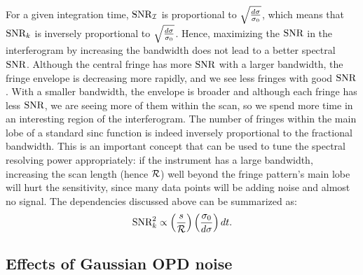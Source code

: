 For a given integration time, $\textrm{SNR}_{\mathcal{I}}$ is proportional to $\sqrt{\frac{d\sigma}{\sigma_0}}$, which means that $\textrm{SNR}_k$ is inversely proportional to $\sqrt{\frac{d\sigma}{\sigma_0}}$. Hence, maximizing the $\textrm{SNR}$ in the interferogram by increasing the bandwidth does not lead to a better spectral $\textrm{SNR}$. Although the central fringe has more $\textrm{SNR}$ with a larger bandwidth, the fringe envelope is decreasing more rapidly, and we see less fringes with good $\textrm{SNR}$. With a smaller bandwidth, the envelope is broader and although each fringe has less $\textrm{SNR}$, we are seeing more of them within the scan, so we spend more time in an interesting region of the interferogram. The number of fringes within the main lobe of a standard sinc function is indeed inversely proportional to the fractional bandwidth. This is an important concept that can be used to tune the spectral resolving power appropriately: if the instrument has a large bandwidth, increasing the scan length (hence $\mathcal{R}$) well beyond the fringe pattern's main lobe will hurt the sensitivity, since many data points will be adding noise and almost no signal. The dependencies discussed above can be summarized as:
\begin{equation}
\textrm{SNR}_k^2 \propto \left(\frac{s}{\mathcal{R}}\right)\left(\frac{ \sigma_0}{d\sigma}\right)  dt .
\end{equation}





\subsection{Effects of Gaussian OPD noise}


